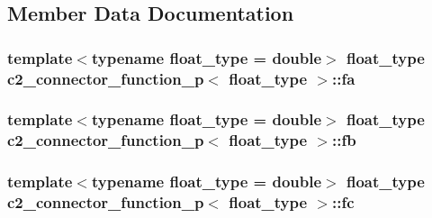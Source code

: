 \subsection{Member Data Documentation}
\subsubsection[{\texorpdfstring{fa}{fa}}]{\setlength{\rightskip}{0pt plus 5cm}template$<$typename float\+\_\+type = double$>$ float\+\_\+type {\bf c2\+\_\+connector\+\_\+function\+\_\+p}$<$ float\+\_\+type $>$\+::fa\hspace{0.3cm}{\ttfamily [protected]}}\hypertarget{classc2__connector__function__p_a3057f77c22dc61e93a1a3485780dd93f}{}\label{classc2__connector__function__p_a3057f77c22dc61e93a1a3485780dd93f}
\subsubsection[{\texorpdfstring{fb}{fb}}]{\setlength{\rightskip}{0pt plus 5cm}template$<$typename float\+\_\+type = double$>$ float\+\_\+type {\bf c2\+\_\+connector\+\_\+function\+\_\+p}$<$ float\+\_\+type $>$\+::fb\hspace{0.3cm}{\ttfamily [protected]}}\hypertarget{classc2__connector__function__p_a3eff36726d4717fca41848605cd53916}{}\label{classc2__connector__function__p_a3eff36726d4717fca41848605cd53916}
\subsubsection[{\texorpdfstring{fc}{fc}}]{\setlength{\rightskip}{0pt plus 5cm}template$<$typename float\+\_\+type = double$>$ float\+\_\+type {\bf c2\+\_\+connector\+\_\+function\+\_\+p}$<$ float\+\_\+type $>$\+::fc\hspace{0.3cm}{\ttfamily [protected]}}\hypertarget{classc2__connector__function__p_a0f0edb256a18551e2d054e47487d5b1d}{}\label{classc2__connector__function__p_a0f0edb256a18551e2d054e47487d5b1d}
